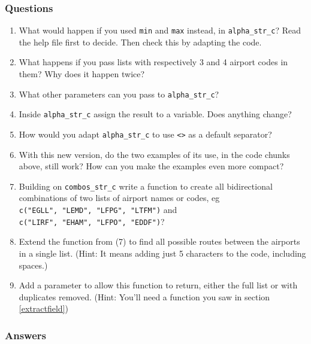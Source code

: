 \documentclass[
]{book}
\providecommand{\tightlist}{%
  \setlength{\itemsep}{0pt}\setlength{\parskip}{0pt}}
\begin{document}
\hypertarget{questions-6}{%
\subsubsection{Questions}\label{questions-6}}

\begin{enumerate}
\def\labelenumi{\arabic{enumi})}
\tightlist
\item
  What would happen if you used \texttt{min} and \texttt{max} instead, in \texttt{alpha\_str\_c}? Read the help file first to decide. Then check this by adapting the code.
\item
  What happens if you pass lists with respectively 3 and 4 airport codes in them? Why does it happen twice?
\item
  What other parameters can you pass to \texttt{alpha\_str\_c}?
\item
  Inside \texttt{alpha\_str\_c} assign the result to a variable. Does anything change?
\item
  How would you adapt \texttt{alpha\_str\_c} to use \texttt{\textless{}\textgreater{}} as a default separator?
\item
  With this new version, do the two examples of its use, in the code chunks above, still work? How can you make the examples even more compact?
\item
  Building on \texttt{combos\_str\_c} write a function to create all bidirectional combinations of two lists of airport names or codes, eg \texttt{c("EGLL",\ "LEMD",\ "LFPG",\ "LTFM")} and \texttt{c("LIRF",\ "EHAM",\ "LFPO",\ "EDDF")}?
\item
  Extend the function from (7) to find all possible routes between the airports in a single list. (Hint: It means adding just 5 characters to the code, including spaces.)
\item
  Add a parameter to allow this function to return, either the full list or with duplicates removed. (Hint: You'll need a function you saw in section \ref{extractfield})
\end{enumerate}

\hypertarget{answers-6}{%
\subsubsection{Answers}\label{answers-6}}
\end{document}
